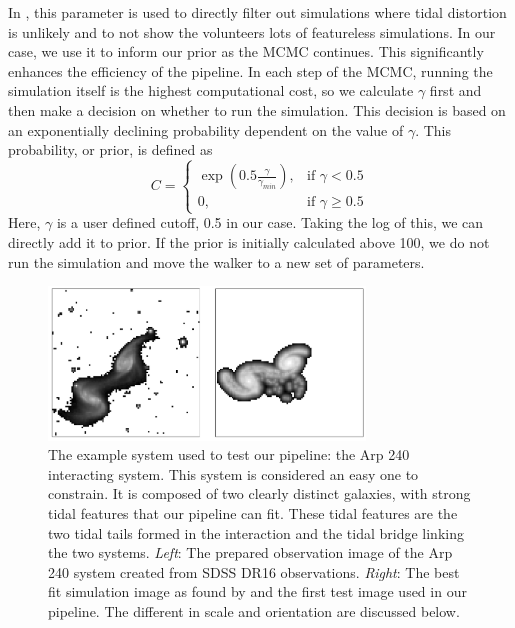 In \citet{Holincheck_16}, this parameter is used to directly filter out simulations where tidal distortion is unlikely and to not show the volunteers lots of featureless simulations. In our case, we use it to inform our prior as the MCMC continues. This significantly enhances the efficiency of the pipeline. In each step of the MCMC, running the simulation itself is the highest computational cost, so we calculate $\gamma$ first and then make a decision on whether to run the simulation. This decision is based on an exponentially declining probability dependent on the value of $\gamma$. This probability, or prior, is defined as 
\begin{equation}\label{tidal_prob}
    C = 
    \begin{cases}
        \exp(0.5\frac{\gamma}{\gamma_{min}}), & \text{if } \gamma < 0.5 \\
        0, & \text{if } \gamma \geq 0.5
    \end{cases}
\end{equation}
Here, $\gamma$ is a user defined cutoff, 0.5 in our case. Taking the log of this, we can directly add it to prior. If the prior is initially calculated above 100, we do not run the simulation and move the walker to a new set of parameters.

\begin{figure}
    \centering
    \includegraphics[width=0.75\textwidth]{Chapter1/figures/arp240-obs-sim.pdf}
    \caption{The example system used to test our pipeline: the Arp 240 interacting system. This system is considered an easy one to constrain. It is composed of two clearly distinct galaxies, with strong tidal features that our pipeline can fit. These tidal features are the two tidal tails formed in the interaction and the tidal bridge linking the two systems. \textit{Left}: The prepared observation image of the Arp 240 system created from SDSS DR16 observations. \textit{Right}: The best fit simulation image as found by \citet{Holincheck_16} and the first test image used in our pipeline. The different in scale and orientation are discussed below.}
    \label{fig:arp240}
\end{figure}

